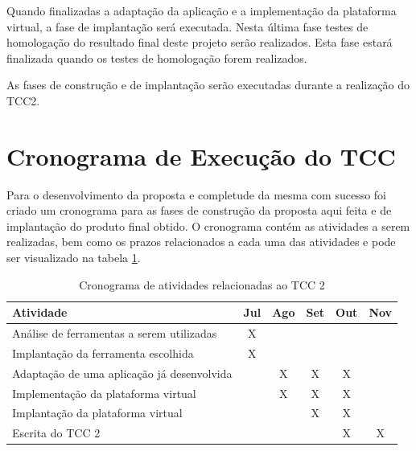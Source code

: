 Quando finalizadas a adaptação da aplicação e a implementação da plataforma virtual, a fase de implantação será executada. Nesta última fase testes de homologação do resultado final deste projeto serão realizados. Esta fase estará finalizada quando os testes de homologação forem realizados.

As fases de construção e de implantação serão executadas durante a realização do TCC2.

\section{Cronograma de Execução do TCC}
Para o desenvolvimento da proposta e completude da mesma com sucesso foi criado um cronograma para as fases de construção da proposta aqui feita e de implantação do produto final obtido. O cronograma contém as atividades a serem realizadas, bem como os prazos relacionados a cada uma das atividades e pode ser visualizado na tabela \ref{cronograma_tcc2}.

\begin{table}[!h]
\centering
\caption{Cronograma de atividades relacionadas ao TCC 2}
\label{cronograma_tcc2}
\begin{tabular}{|p{9cm}|c|c|c|c|c|}
\hline
Atividade                                                   & \multicolumn{1}{l|}{Jul} & \multicolumn{1}{l|}{Ago} & \multicolumn{1}{l|}{Set} & \multicolumn{1}{l|}{Out} & \multicolumn{1}{l|}{Nov} \\ \hline
Análise de ferramentas a serem utilizadas                   & X                           &                             &                              &                            &                             \\ \hline
Implantação da ferramenta escolhida                         & X                           &                             &                              &                            &                             \\ \hline
Adaptação de uma aplicação já desenvolvida                  &                             & X                              & X                            & X                          &                              \\ \hline
Implementação da plataforma virtual                         &                             & X                          & X                            & X                          &                             \\ \hline
Implantação da plataforma virtual                           &                             &                            & X                          & X                            &                             \\ \hline
Escrita do TCC 2                                            &                             &                             &                            & X                            & X                           \\ \hline
\end{tabular}
\end{table}



